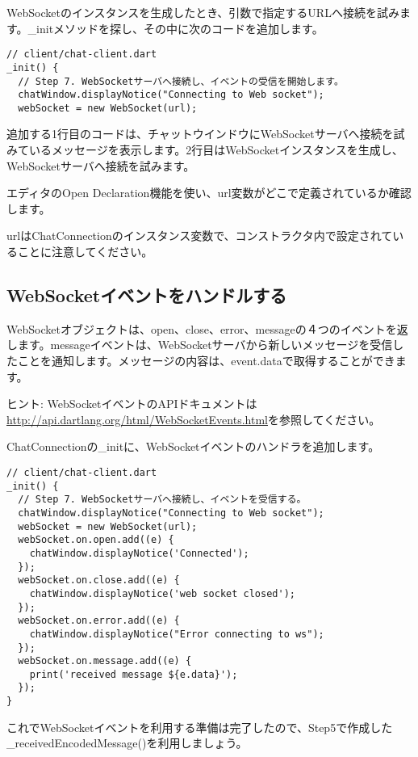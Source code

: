WebSocketのインスタンスを生成したとき、引数で指定するURLへ接続を試みます。\_initメソッドを探し、その中に次のコードを追加します。

\begin{verbatim}
// client/chat-client.dart
_init() {
  // Step 7. WebSocketサーバへ接続し、イベントの受信を開始します。
  chatWindow.displayNotice("Connecting to Web socket");
  webSocket = new WebSocket(url);
\end{verbatim}

追加する1行目のコードは、チャットウインドウにWebSocketサーバへ接続を試みているメッセージを表示します。2行目はWebSocketインスタンスを生成し、WebSocketサーバへ接続を試みます。

エディタのOpen Declaration機能を使い、url変数がどこで定義されているか確認します。


urlはChatConnectionのインスタンス変数で、コンストラクタ内で設定されていることに注意してください。

\subsection{WebSocketイベントをハンドルする}

WebSocketオブジェクトは、open、close、error、messageの４つのイベントを返します。messageイベントは、WebSocketサーバから新しいメッセージを受信したことを通知します。メッセージの内容は、event.dataで取得することができます。

ヒント: WebSocketイベントのAPIドキュメントは\url{http://api.dartlang.org/html/WebSocketEvents.html}を参照してください。

ChatConnectionの\_initに、WebSocketイベントのハンドラを追加します。

\begin{verbatim}
// client/chat-client.dart
_init() {
  // Step 7. WebSocketサーバへ接続し、イベントを受信する。
  chatWindow.displayNotice("Connecting to Web socket");
  webSocket = new WebSocket(url);
  webSocket.on.open.add((e) {
    chatWindow.displayNotice('Connected');
  });
  webSocket.on.close.add((e) {
    chatWindow.displayNotice('web socket closed');
  });
  webSocket.on.error.add((e) {
    chatWindow.displayNotice("Error connecting to ws");
  });
  webSocket.on.message.add((e) {
    print('received message ${e.data}');
  });
}
\end{verbatim}

これでWebSocketイベントを利用する準備は完了したので、Step5で作成した\_receivedEncodedMessage()を利用しましょう。


